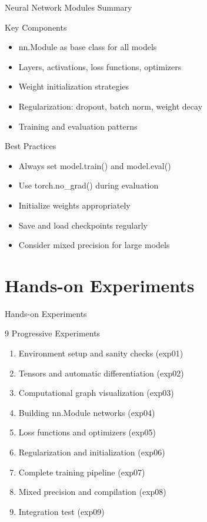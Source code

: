 \documentclass[aspectratio=169,10pt]{beamer}
\begin{document}
\begin{frame}{Neural Network Modules Summary}
\begin{block}{Key Components}
\begin{itemize}
    \item nn.Module as base class for all models
    \item Layers, activations, loss functions, optimizers
    \item Weight initialization strategies
    \item Regularization: dropout, batch norm, weight decay
    \item Training and evaluation patterns
\end{itemize}
\end{block}

\begin{alertblock}{Best Practices}
\begin{itemize}
    \item Always set model.train() and model.eval()
    \item Use torch.no\_grad() during evaluation
    \item Initialize weights appropriately
    \item Save and load checkpoints regularly
    \item Consider mixed precision for large models
\end{itemize}
\end{alertblock}
\end{frame}

\section{Hands-on Experiments}

\begin{frame}{Hands-on Experiments}
\begin{center}
\Large{9 Progressive Experiments}
\end{center}

\begin{enumerate}
    \item Environment setup and sanity checks (exp01)
    \item Tensors and automatic differentiation (exp02)
    \item Computational graph visualization (exp03)
    \item Building nn.Module networks (exp04)
    \item Loss functions and optimizers (exp05)
    \item Regularization and initialization (exp06)
    \item Complete training pipeline (exp07)
    \item Mixed precision and compilation (exp08)
    \item Integration test (exp09)
\end{enumerate}
\end{frame}
\end{document}
